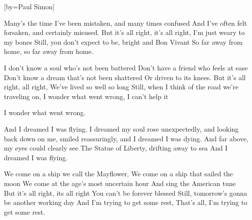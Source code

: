 


[by={Paul Simon}]



\beginverse
Many's the time I've been mistaken, and many times confused
And I've often felt forsaken, and certainly misused.
But it's all right, it's all right, I'm just weary to my bones
Still, you don't expect to be, bright and Bon Vivant
So far away from home, so far away from home.
\endverse

\beginverse
I don't know a soul who's not been battered
Don't have a friend who feels at ease
Don't know a dream that's not been shattered
Or driven to its knees.
But it's all right, all right,
We've lived so well so long
Still, when I think of the road we're traveling on,
I wonder what went wrong,
I can't help it

I wonder what went wrong.
\endverse

\beginverse
And I dreamed I was flying. I dreamed my soul rose unexpectedly,
and looking back down on me, smiled reassuringly,
and I dreamed I was dying. And far above, my eyes could clearly see
The Statue of Liberty, drifting away to sea
And I dreamed I was flying.
\endverse

\beginverse
We come on a ship we call the Mayflower,
We come on a ship that sailed the moon
We come at the age's most uncertain hour
And sing the American tune
But it's all right, its all right
You can't be forever blessed
Still, tomorrow's gonna be another working day
And I'm trying to get some rest,
That's all, I'm trying to get some rest.
\endverse


\endsong
